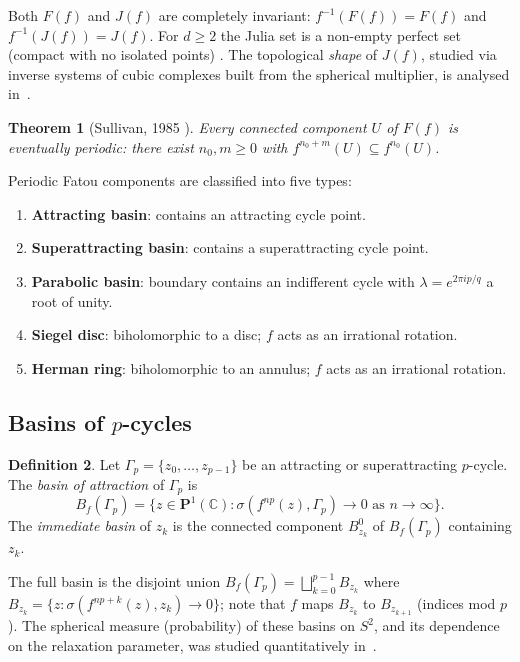\documentclass[12pt]{article}
\newtheorem{theorem}{Theorem}[section]
\theoremstyle{definition}
\newtheorem{definition}[theorem]{Definition}
\newcommand{\C}{\mathbb{C}}
\newcommand{\Pone}{\mathbf{P}^1(\C)}
\newcommand{\Ff}{F(f)}
\newcommand{\Jf}{J(f)}
\newcommand{\Bf}{B_f}
\begin{document}
Both $\Ff$ and $\Jf$ are completely invariant: $f^{-1}(\Ff)=\Ff$ and
$f^{-1}(\Jf)=\Jf$.  For $d\geq 2$ the Julia set is a non-empty perfect
set (compact with no isolated points) \cite{Milnor2006}.
The topological \emph{shape} of $\Jf$, studied via inverse systems of
cubic complexes built from the spherical multiplier, is analysed
in~\cite{Extremiana2018Shape,Extremiana2018SelfOverlays}.

\begin{theorem}[Sullivan, 1985 \cite{Sullivan1985}]
Every connected component $U$ of $\Ff$ is eventually periodic: there
exist $n_0,m\geq 0$ with $f^{n_0+m}(U)\subseteq f^{n_0}(U)$.
\end{theorem}

Periodic Fatou components are classified into five types:
\begin{enumerate}[label=(\roman*)]
  \item \textbf{Attracting basin}: contains an attracting cycle point.
  \item \textbf{Superattracting basin}: contains a superattracting cycle
        point.
  \item \textbf{Parabolic basin}: boundary contains an indifferent cycle
        with $\lambda=e^{2\pi i p/q}$ a root of unity.
  \item \textbf{Siegel disc}: biholomorphic to a disc; $f$ acts as an
        irrational rotation.
  \item \textbf{Herman ring}: biholomorphic to an annulus; $f$ acts as an
        irrational rotation.
\end{enumerate}

\subsection{Basins of $p$-cycles}

\begin{definition}\label{def:basin}
Let $\Gamma_p=\{z_0,\ldots,z_{p-1}\}$ be an attracting or superattracting
$p$-cycle.  The \emph{basin of attraction} of $\Gamma_p$ is
\begin{equation}\label{eq:basin}
  \Bf(\Gamma_p) = \bigl\{z\in\Pone : \sigma(f^{np}(z),\Gamma_p)\to 0
                           \text{ as }n\to\infty\bigr\}.
\end{equation}
The \emph{immediate basin} of $z_k$ is the connected component $B^0_{z_k}$
of $\Bf(\Gamma_p)$ containing $z_k$.
\end{definition}

The full basin is the disjoint union $\Bf(\Gamma_p)=\bigsqcup_{k=0}^{p-1}
B_{z_k}$ where $B_{z_k}=\{z:\sigma(f^{np+k}(z),z_k)\to 0\}$; note that
$f$ maps $B_{z_k}$ to $B_{z_{k+1}}$ (indices mod $p$).
The spherical measure (probability) of these basins on $S^2$, and its
dependence on the relaxation parameter, was studied quantitatively
in~\cite{Gutierrez2016Measures}.
\end{document}
